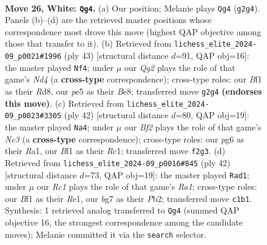 \documentclass[11pt]{article}
\begin{document}
\begin{figure}[p]
\label{fig:thought-m48}
\end{figure}

\clearpage

\begin{figure}[p]\centering
\begin{subfigure}{0.46\textwidth}\centering
\resizebox{\linewidth}{!}{%
\newchessgame
\chessboard[
  setfen={r6r/1q1b1kbp/p1npp1p1/1p2p1P1/4Pn1P/2N2P2/PPPK1BQ1/R1R2B2 w - - 3 26},
  showmover=false,
  pgfstyle=straightmove, color=movearrow, markmove={g2-g4}
]}
\caption{}
\end{subfigure}\hfill
\begin{subfigure}{0.46\textwidth}\centering
\resizebox{\linewidth}{!}{%
\newchessgame
\chessboard[
  setfen={1k1rbb1r/ppp5/4qp2/3np1pp/2N1P3/PP1P3P/1BQ2PP1/R2R1BK1 b - - 0 22},
  showmover=false,
  pgfstyle=straightmove, color=movearrow, markmove={d5-f4}
]}
\caption{}
\end{subfigure}
\\[4pt]
\begin{subfigure}{0.46\textwidth}\centering
\resizebox{\linewidth}{!}{%
\newchessgame
\chessboard[
  setfen={r3r1k1/1pq3bp/p2p2p1/Pb1Pnp2/1PpB4/2N3P1/3QPPBP/R1R3K1 w - - 0 22},
  showmover=false,
  pgfstyle=straightmove, color=movearrow, markmove={c3-a4}
]}
\caption{}
\end{subfigure}\hfill
\begin{subfigure}{0.46\textwidth}\centering
\resizebox{\linewidth}{!}{%
\newchessgame
\chessboard[
  setfen={2rqrbk1/5pp1/b3p2p/p2pP1nP/1p1N1B2/6P1/PPPQ1PB1/R3R1K1 w - - 2 22},
  showmover=false,
  pgfstyle=straightmove, color=movearrow, markmove={a1-d1}
]}
\caption{}
\end{subfigure}
\caption{\textbf{Move 26, White: \texttt{Qg4}.} (a) Our position; Melanie plays \texttt{Qg4} (\texttt{g2g4}). Panels (b)--(d) are the retrieved master positions whose correspondence most drove this move (highest QAP objective among those that transfer to it). (b) Retrieved from \texttt{lichess\_elite\_2024-09\_p0021\#1996} (ply 43) [structural distance $d$=91, QAP obj=16]: the master played \texttt{Nf4}; under $\mu$ our \emph{Qg2} plays the role of that game's \emph{Nd4} (a \textbf{cross-type} correspondence); cross-type roles: our \emph{B}f1 as their \emph{R}d8, our \emph{p}e5 as their \emph{B}e8; transferred move \texttt{g2g4} \textbf{(endorses this move)}. (c) Retrieved from \texttt{lichess\_elite\_2024-09\_p0023\#3305} (ply 42) [structural distance $d$=80, QAP obj=19]: the master played \texttt{Na4}; under $\mu$ our \emph{Bf2} plays the role of that game's \emph{Nc3} (a \textbf{cross-type} correspondence); cross-type roles: our \emph{p}g6 as their \emph{R}a1, our \emph{B}f1 as their \emph{R}c1; transferred move \texttt{f2g3}. (d) Retrieved from \texttt{lichess\_elite\_2024-09\_p0016\#845} (ply 42) [structural distance $d$=73, QAP obj=19]: the master played \texttt{Rad1}; under $\mu$ our \emph{Rc1} plays the role of that game's \emph{Ra1}; cross-type roles: our \emph{B}f1 as their \emph{R}e1, our \emph{b}g7 as their \emph{P}b2; transferred move \texttt{c1b1}. Synthesis: 1 retrieved analog transferred to \texttt{Qg4} (summed QAP objective 16, the strongest correspondence among the candidate moves); Melanie committed it via the \texttt{search} selector.}

\end{figure}
\end{document}
